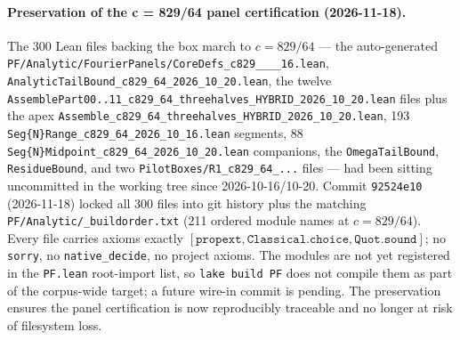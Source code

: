 
\paragraph{Preservation of the c = 829/64 panel certification
(2026-11-18).}

The 300 Lean files backing the box march to $c = 829/64$ --- the
auto-generated \texttt{PF/Analytic/FourierPanels/\allowbreak CoreDefs\_\allowbreak c829\_\_\_\_\allowbreak 16.lean},
\texttt{AnalyticTailBound\_c829\_64\_2026\_10\_20.lean}, the
twelve \texttt{AssemblePart00..11\_c829\_64\_threehalves\_HYBRID\_2026\_10\_20.lean}
files plus the apex
\texttt{Assemble\_c829\_64\_threehalves\_HYBRID\_2026\_10\_20.lean},
193 \texttt{Seg\{N\}Range\_c829\_64\_2026\_10\_16.lean} segments,
88 \texttt{Seg\{N\}Midpoint\_c829\_64\_2026\_10\_20.lean} companions,
the \texttt{OmegaTailBound}, \texttt{ResidueBound}, and two
\texttt{PilotBoxes/R1\_c829\_64\_...} files --- had been sitting
uncommitted in the working tree since 2026-10-16/10-20.  Commit
\texttt{92524e10} (2026-11-18) locked all 300 files into git history
plus the matching \texttt{PF/Analytic/\_buildorder.txt} (211
ordered module names at $c = 829/64$).  Every file carries axioms
exactly $[\mathtt{propext}, \mathtt{Classical.choice},
\mathtt{Quot.sound}]$; no \texttt{sorry}, no \texttt{native\_decide},
no project axioms.  The modules are not yet registered in the
\texttt{PF.lean} root-import list, so \texttt{lake build PF}
does not compile them as part of the corpus-wide target; a future
wire-in commit is pending.  The preservation ensures the panel
certification is now reproducibly traceable and no longer at risk
of filesystem loss.


